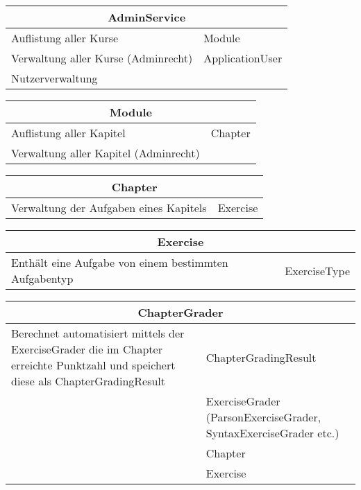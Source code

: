 \documentclass[11pt]{article}
\begin{document}
\begin{table}[h]
\begin{tabularx}{\textwidth}{|X|X|}
\hline
\multicolumn{2}{|c|}{AdminService}\\ \hline
Auflistung aller Kurse & Module  \\  \hline
Verwaltung aller Kurse (Adminrecht) & ApplicationUser \\ \hline
Nutzerverwaltung & \\ \hline
\end{tabularx}
\end{table}

\begin{table}[h]
\begin{tabularx}{\textwidth}{|X|X|}
\hline
\multicolumn{2}{|c|}{Module}\\ \hline
Auflistung aller Kapitel & Chapter  \\  \hline
Verwaltung aller Kapitel (Adminrecht) & \\ \hline
\end{tabularx}
\end{table}

\begin{table}[h]
\begin{tabularx}{\textwidth}{|X|X|}
\hline
\multicolumn{2}{|c|}{Chapter}\\ \hline
Verwaltung der Aufgaben eines Kapitels & Exercise   \\  \hline
\end{tabularx}

\end{table}

\begin{table}[h]
\begin{tabularx}{\textwidth}{|X|X|}
\hline
\multicolumn{2}{|c|}{Exercise}\\ \hline
Enthält eine Aufgabe von einem bestimmten Aufgabentyp & ExerciseType   \\  \hline
\end{tabularx}

\end{table}


\begin{table}[h]
\begin{tabularx}{\textwidth}{|X|X|}
\hline
\multicolumn{2}{|c|}{ChapterGrader}\\ \hline
Berechnet automatisiert mittels der ExerciseGrader die im Chapter erreichte Punktzahl und speichert diese als ChapterGradingResult & ChapterGradingResult \\  \hline
& ExerciseGrader (ParsonExerciseGrader, SyntaxExerciseGrader etc.)\\ \hline
 & Chapter\\ \hline
 & Exercise  \\
\end{tabularx}
\end{table}
\end{document}
